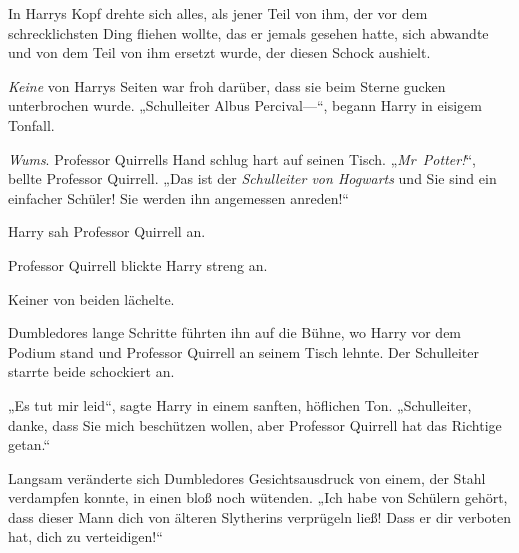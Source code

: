 In Harrys Kopf drehte sich alles, als jener Teil von ihm, der vor dem schrecklichsten Ding fliehen wollte, das er jemals gesehen hatte, sich abwandte und von dem Teil von ihm ersetzt wurde, der diesen Schock aushielt.

\emph{Keine} von Harrys Seiten war froh darüber, dass sie beim Sterne gucken unterbrochen wurde. „Schulleiter Albus Percival—“, begann Harry in eisigem Tonfall.

\emph{Wums}. Professor Quirrells Hand schlug hart auf seinen Tisch. „\emph{Mr~Potter!}“, bellte Professor Quirrell. „Das ist der \emph{Schulleiter von Hogwarts} und Sie sind ein einfacher Schüler! Sie werden ihn angemessen anreden!“

Harry sah Professor Quirrell an.

Professor Quirrell blickte Harry streng an.

Keiner von beiden lächelte.

Dumbledores lange Schritte führten ihn auf die Bühne, wo Harry vor dem Podium stand und Professor Quirrell an seinem Tisch lehnte. Der Schulleiter starrte beide schockiert an.

„Es tut mir leid“, sagte Harry in einem sanften, höflichen Ton. „Schulleiter, danke, dass Sie mich beschützen wollen, aber Professor Quirrell hat das Richtige getan.“

Langsam veränderte sich Dumbledores Gesichtsausdruck von einem, der Stahl verdampfen konnte, in einen bloß noch wütenden. „Ich habe von Schülern gehört, dass dieser Mann dich von älteren Slytherins verprügeln ließ! Dass er dir verboten hat, dich zu verteidigen!“

